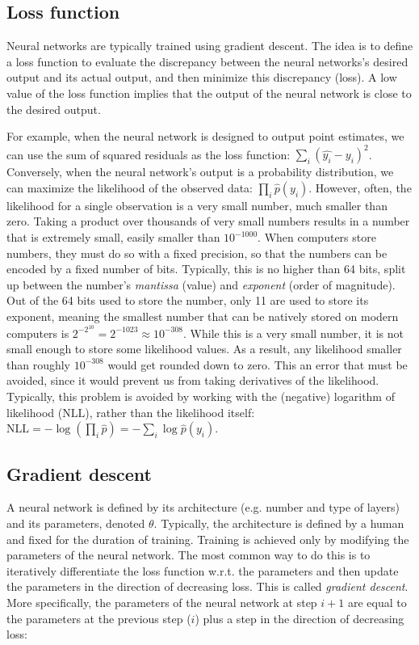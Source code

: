 \documentclass[12pt]{article}
\begin{document}
\subsection{Loss function}
\label{sec_loss_fn}

Neural networks are typically trained using gradient descent. The idea is to define a loss function to evaluate the discrepancy between the neural networks's desired output and its actual output, and then minimize this discrepancy (loss). A low value of the loss function implies that the output of the neural network is close to the desired output.

For example, when the neural network is designed to output point estimates, we can use the sum of squared residuals as the loss function: $\sum_i (\hat{y_i} - y_i)^2$. Conversely, when the neural network's output is a probability distribution, we can maximize the likelihood of the observed data: $\prod_i \hat{p}(y_i)$. However, often, the likelihood for a single observation is a very small number, much smaller than zero. Taking a product over thousands of very small numbers results in a number that is extremely small, easily smaller than $10^{-1000}$. When computers store numbers, they must do so with a fixed precision, so that the numbers can be encoded by a fixed number of bits. Typically, this is no higher than 64 bits, split up between the number's \textit{mantissa} (value) and \textit{exponent} (order of magnitude). Out of the 64 bits used to store the number, only 11 are used to store its exponent, meaning the smallest number that can be natively stored on modern computers is $2^{-2^{10}} = 2^{-1023} \approx 10^{-308}$. While this is a very small number, it is not small enough to store some likelihood values. As a result, any likelihood smaller than roughly $10^{-308}$ would get rounded down to zero. This an error that must be avoided, since it would prevent us from taking derivatives of the likelihood. Typically, this problem is avoided by working with the (negative) logarithm of likelihood ($\textrm{NLL}$), rather than the likelihood itself: $\textrm{NLL} = -\log(\prod_i \hat{p}) = -\sum_i \log\hat{p}(y_i)$.

\subsection{Gradient descent}

A neural network is defined by its architecture (e.g. number and type of layers) and its parameters, denoted $\theta$. Typically, the architecture is defined by a human and fixed for the duration of training. Training is achieved only by modifying the parameters of the neural network. The most common way to do this is to iteratively differentiate the loss function w.r.t. the parameters and then update the parameters in the direction of decreasing loss. This is called \textit{gradient descent}. More specifically, the parameters of the neural network at step $i+1$ are equal to the parameters at the previous step ($i$) plus a step in the direction of decreasing loss:
\end{document}
